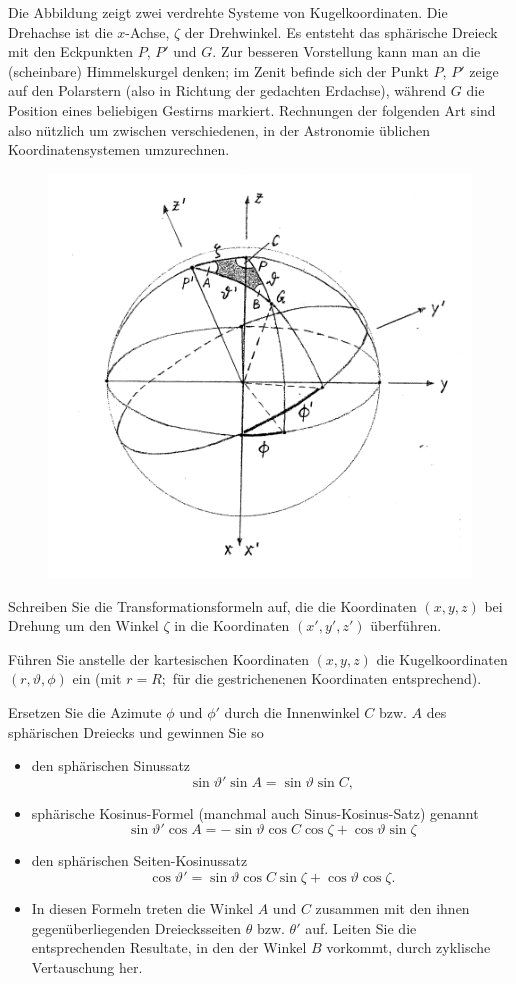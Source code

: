 \begin{atiTask}[
  title = Sphärische Trigonometrie
]

Die Abbildung zeigt zwei verdrehte Systeme von Kugelkoordinaten. Die Drehachse ist die $x$-Achse, $\zeta$ der Drehwinkel. Es entsteht das sphärische Dreieck mit den Eckpunkten $P$, $P'$ und $G$. Zur besseren Vorstellung kann man an die (scheinbare) Himmelskurgel denken; im Zenit befinde sich der Punkt $P$, $P'$ zeige auf den Polarstern (also in Richtung der gedachten Erdachse), während $G$ die Position eines beliebigen Gestirns markiert. Rechnungen der folgenden Art sind also nützlich um zwischen verschiedenen, in der Astronomie üblichen Koordinatensystemen umzurechnen.

\begin{figure}[H]
  \centering
  \includegraphics[width=0.6\linewidth]{./Trigonometrie}
  \label{fig:Trigonometrie}
\end{figure}


\begin{atiSubtasks}
\item Schreiben Sie die Transformationsformeln auf, die die Koordinaten $(x,y,z)$ bei Drehung um den Winkel $\zeta$ in die Koordinaten $(x',y',z')$ überführen.
\item Führen Sie anstelle der kartesischen Koordinaten $(x,y,z)$ die Kugelkoordinaten $(r,\vartheta,\phi)$ ein (mit $r=R;$ für die gestrichenenen Koordinaten entsprechend).
\item Ersetzen Sie die Azimute $\phi$ und $\phi'$ durch die Innenwinkel $C$ bzw. $A$ des sphärischen Dreiecks und gewinnen Sie so
\begin{itemize}
\item den sphärischen Sinussatz
\[
\sin\vartheta'\sin A=\sin \vartheta \sin C,
\]
\item sphärische Kosinus-Formel (manchmal auch Sinus-Kosinus-Satz) genannt
\[
\sin \vartheta'\cos A=-\sin \vartheta \cos C\cos \zeta+\cos \vartheta\sin \zeta
\]
\item den sphärischen Seiten-Kosinussatz
\[
\cos \vartheta'=\sin\vartheta \cos C\sin\zeta+\cos \vartheta\cos \zeta.
\]
\item In diesen Formeln treten die Winkel $A$ und $C$ zusammen mit den ihnen gegenüberliegenden Dreiecksseiten $\theta$ bzw. $\theta'$ auf. Leiten Sie die entsprechenden Resultate, in den der Winkel $B$ vorkommt, durch zyklische Vertauschung her.
\end{itemize}
\end{atiSubtasks}
\end{atiTask}
